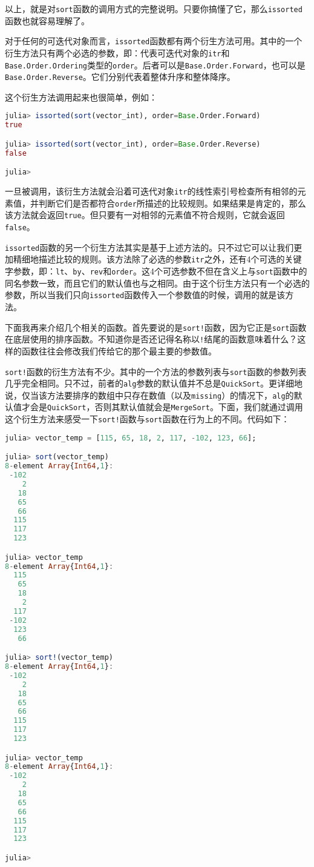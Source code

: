 以上，就是对\verb`sort`函数的调用方式的完整说明。只要你搞懂了它，那么\verb`issorted`函数也就容易理解了。

对于任何的可迭代对象而言，\verb`issorted`函数都有两个衍生方法可用。其中的一个衍生方法只有两个必选的参数，即：代表可迭代对象的\verb`itr`和\verb`Base.Order.Ordering`类型的\verb`order`。后者可以是\verb`Base.Order.Forward`，也可以是\verb`Base.Order.Reverse`。它们分别代表着整体升序和整体降序。

这个衍生方法调用起来也很简单，例如：

\begin{lstlisting}[language=julia]
julia> issorted(sort(vector_int), order=Base.Order.Forward)
true

julia> issorted(sort(vector_int), order=Base.Order.Reverse)
false

julia> 
\end{lstlisting}

一旦被调用，该衍生方法就会沿着可迭代对象\verb`itr`的线性索引号检查所有相邻的元素值，并判断它们是否都符合\verb`order`所描述的比较规则。如果结果是肯定的，那么该方法就会返回\verb`true`。但只要有一对相邻的元素值不符合规则，它就会返回\verb`false`。

\verb`issorted`函数的另一个衍生方法其实是基于上述方法的。只不过它可以让我们更加精细地描述比较的规则。该方法除了必选的参数\verb`itr`之外，还有4个可选的关键字参数，即：\verb`lt`、\verb`by`、\verb`rev`和\verb`order`。这4个可选参数不但在含义上与\verb`sort`函数中的同名参数一致，而且它们的默认值也与之相同。由于这个衍生方法只有一个必选的参数，所以当我们只向\verb`issorted`函数传入一个参数值的时候，调用的就是该方法。

下面我再来介绍几个相关的函数。首先要说的是\verb`sort!`函数，因为它正是\verb`sort`函数在底层使用的排序函数。不知道你是否还记得名称以\verb`!`结尾的函数意味着什么？这样的函数往往会修改我们传给它的那个最主要的参数值。

\verb`sort!`函数的衍生方法有不少。其中的一个方法的参数列表与\verb`sort`函数的参数列表几乎完全相同。只不过，前者的\verb`alg`参数的默认值并不总是\verb`QuickSort`。更详细地说，仅当该方法要排序的数组中只存在数值（以及\verb`missing`）的情况下，\verb`alg`的默认值才会是\verb`QuickSort`，否则其默认值就会是\verb`MergeSort`。下面，我们就通过调用这个衍生方法来感受一下\verb`sort!`函数与\verb`sort`函数在行为上的不同。代码如下：

\begin{lstlisting}[language=julia]
julia> vector_temp = [115, 65, 18, 2, 117, -102, 123, 66];

julia> sort(vector_temp)
8-element Array{Int64,1}:
 -102
    2
   18
   65
   66
  115
  117
  123

julia> vector_temp
8-element Array{Int64,1}:
  115
   65
   18
    2
  117
 -102
  123
   66

julia> sort!(vector_temp)
8-element Array{Int64,1}:
 -102
    2
   18
   65
   66
  115
  117
  123

julia> vector_temp
8-element Array{Int64,1}:
 -102
    2
   18
   65
   66
  115
  117
  123

julia> 
\end{lstlisting}

